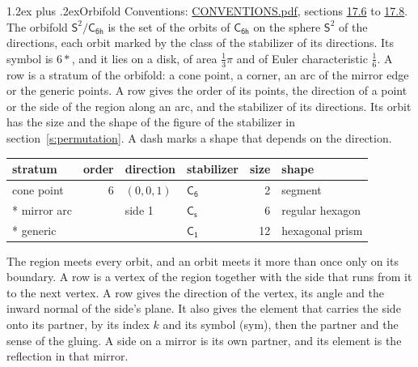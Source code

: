\documentclass[10pt,a4paper]{article}
\makeatletter
\renewcommand\section{\@startsection{section}{1}{\z@}{-3ex plus -1ex minus -.2ex}%
  {1.2ex plus .2ex}{\normalfont\large\sffamily\bfseries\color{parttitle}}}
\numberwithin{equation}{section}
\newcommand{\grp}[1]{\mathsf{#1}}
\newcommand{\orbname}[1]{#1}
\newcommand{\dirvec}[3]{(#1, #2, #3)}
\newcommand{\twosphere}{\mathsf{S}^{2}}
\makeatother
\begin{document}
\section{Orbifold}\label{s:orbifold}
Conventions: \href{../../CONVENTIONS.pdf}{CONVENTIONS.pdf}, sections \href{../../CONVENTIONS.pdf\#conv.17.6}{17.6} to \href{../../CONVENTIONS.pdf\#conv.17.8}{17.8}.
The orbifold $\twosphere/\grp{C_{6h}}$ is the set of the orbits of $\grp{C_{6h}}$ on the sphere $\twosphere$ of the directions, each orbit marked by the class of the stabilizer of its directions. Its symbol is $\orbname{6{\ast}}$, and it lies on a disk, of area $\tfrac{1}{3}\pi$ and of Euler characteristic $\tfrac{1}{6}$.
\leavevmode\label{n:head.stratum}\label{n:head.order.point}\label{n:head.direction}\label{n:head.stabilizer}\label{n:head.size.orbit}\label{n:head.shape}A row is a stratum of the orbifold: a cone point, a corner, an arc of the mirror edge or the generic points. A row gives the order of its points, the direction of a point or the side of the region along an arc, and the stabilizer of its directions. Its orbit has the size and the shape of the figure of the stabilizer in section~\ref{s:permutation}. A dash marks a shape that depends on the direction.
{\small\setlength{\tabcolsep}{4pt}\begin{longtable}{@{}lrllrl@{}}\toprule
stratum & order & direction & stabilizer & size & shape\\\midrule\endhead
\bottomrule\endfoot\endlastfoot
cone point & 6 & $\dirvec{0}{0}{1}$ & \href{C6.pdf}{$\grp{C_{6}}$} & 2 & segment\\*
mirror arc &  & side 1 & \href{C1v.pdf}{$\grp{C_{s}}$} & 6 & regular hexagon\\*
generic &  &  & \href{C1.pdf}{$\grp{C_{1}}$} & 12 & hexagonal prism\\
\bottomrule\end{longtable}}
\leavevmode\label{n:head.vertex.region}\label{n:head.angle}\label{n:head.normal.side}\label{n:head.partner}\label{n:head.sense}The region meets every orbit, and an orbit meets it more than once only on its boundary. A row is a vertex of the region together with the side that runs from it to the next vertex. A row gives the direction of the vertex, its angle and the inward normal of the side's plane. It also gives the element that carries the side onto its partner, by its index $k$ and its symbol (sym), then the partner and the sense of the gluing. A side on a mirror is its own partner, and its element is the reflection in that mirror.
\end{document}
